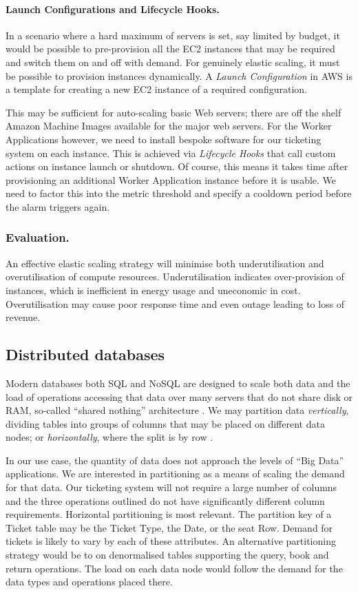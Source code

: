 \documentclass{llncs}
\begin{document}
\paragraph{Launch Configurations and Lifecycle Hooks.} In a scenario where a hard maximum of servers is set, say limited by budget, it would be possible to pre-provision all the EC2 instances that may be required and switch them on and off with demand.  For genuinely elastic scaling, it must be possible to provision instances dynamically.  A {\itshape Launch Configuration} in AWS is a template for creating a new EC2 instance of a required configuration.

This may be sufficient for auto-scaling basic Web servers; there are off the shelf Amazon Machine Images available for the major web servers.  For the Worker Applications however, we need to install bespoke software for our ticketing system on each instance.  This is achieved via {\itshape Lifecycle Hooks} that call custom actions on instance launch or shutdown.  Of course, this means it takes time after provisioning an additional Worker Application instance before it is usable.   We need to factor this into the metric threshold and specify a cooldown period before the alarm triggers again.

\subsubsection{Evaluation.}
An effective elastic scaling strategy will minimise both underutilisation and overutilisation of compute resources.  Underutilisation indicates over-provision of instances, which is inefficient in energy usage and uneconomic in cost.  Overutilisation may cause poor response time and even outage leading to loss of revenue.
\cite{espadas2013tenant}

\subsection{Distributed databases}
Modern databases both SQL and NoSQL are designed to scale both data and the load of operations accessing that data over many servers that do not share disk or RAM, so-called ``shared nothing'' architecture \cite{cattell2011scalable}.  We may partition data {\itshape vertically}, dividing tables into groups of columns that may be placed on different data nodes; or {\itshape horizontally}, where the split is by row \cite{agrawal2004integrating}. 

In our use case, the quantity of data does not approach the levels of ``Big Data'' applications.  We are interested in partitioning as a means of scaling the demand for that data.  Our ticketing system will not require a large number of columns and the three operations outlined do not have significantly different column requirements.  Horizontal partitioning is most relevant.  The partition key of a Ticket table may be the Ticket Type, the Date, or the seat Row.  Demand for tickets is likely to vary by each of these attributes.  An alternative partitioning strategy would be to on denormalised tables supporting the query, book and return operations.  The load on each data node would follow the demand for the data types and operations placed there.
\end{document}
